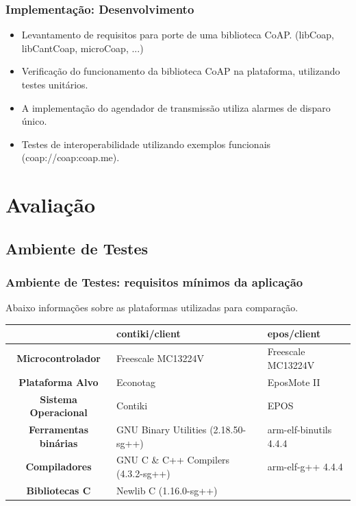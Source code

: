 \documentclass{beamer}
\begin{document}
\begin{frame}
\frametitle{Implementação: Desenvolvimento}
\begin{itemize}
    \item Levantamento de requisitos para porte de uma biblioteca CoAP. (libCoap, libCantCoap, microCoap, ...)
    \item Verificação do funcionamento da biblioteca CoAP na plataforma, utilizando testes unitários.
    \item A implementação do agendador de transmissão utiliza alarmes de disparo único.
    \item Testes de interoperabilidade utilizando exemplos funcionais (coap://coap:coap.me).
\end{itemize}
\end{frame}

\section{Avaliação}

\subsection{Ambiente de Testes}
\begin{frame}
\frametitle{Ambiente de Testes: requisitos mínimos da aplicação}
Abaixo informações sobre as plataformas utilizadas para comparação.
 \begin{table}[!ht]
  \centering
  \scriptsize
  \begin{tabular}{|c|p{3cm}|p{3cm}|}
	\hline
	& \textbf{contiki/client} & \textbf{epos/client}  \\ \hline
	\textbf{Microcontrolador}	  	  & Freescale MC13224V & Freescale MC13224V \\ \hline 
	\textbf{Plataforma Alvo}    & Econotag & EposMote II\\ \hline    
	\textbf{Sistema Operacional}    & Contiki & EPOS \\ \hline    
    \textbf{Ferramentas binárias}		  & GNU Binary Utilities (2.18.50-sg++) & arm-elf-binutils 4.4.4 \\ \hline
    \textbf{Compiladores}		  & GNU C \& C++ Compilers (4.3.2-sg++) & arm-elf-g++ 4.4.4\\ \hline
    \textbf{Bibliotecas C}          & Newlib C (1.16.0-sg++) & \\ \hline 
	\end{tabular}
  \end{table}
\end{frame}
\end{document}
